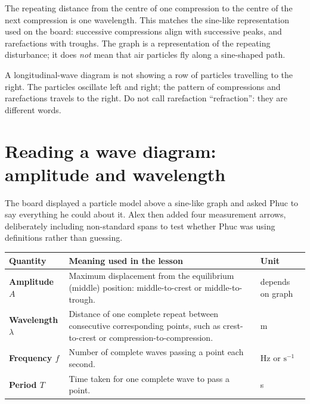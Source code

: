 \documentclass[11pt,a4paper]{article}
\newcommand{\trap}[1]{\begin{mistakebox}#1\end{mistakebox}}
\begin{document}
The repeating distance from the centre of one compression to the centre of the next compression is one wavelength. This matches the sine-like representation used on the board: successive compressions align with successive peaks, and rarefactions with troughs. The graph is a representation of the repeating disturbance; it does \emph{not} mean that air particles fly along a sine-shaped path.

\trap{A longitudinal-wave diagram is not showing a row of particles travelling to the right. The particles oscillate left and right; the pattern of compressions and rarefactions travels to the right. Do not call rarefaction ``refraction'': they are different words.}

\section{Reading a wave diagram: amplitude and wavelength}
The board displayed a particle model above a sine-like graph and asked Phuc to say everything he could about it. Alex then added four measurement arrows, deliberately including non-standard spans to test whether Phuc was using definitions rather than guessing.

\begin{center}
\end{center}

\begin{center}
\begin{tabular}{>{\bfseries}p{2.7cm}p{8.5cm}p{2.1cm}}
\toprule Quantity & Meaning used in the lesson & Unit \\ \midrule
Amplitude $A$ & Maximum displacement from the equilibrium (middle) position: middle-to-crest or middle-to-trough. & depends on graph \\
Wavelength $\lambda$ & Distance of one complete repeat between consecutive corresponding points, such as crest-to-crest or compression-to-compression. & m \\
Frequency $f$ & Number of complete waves passing a point each second. & Hz or $\mathrm{s^{-1}}$ \\
Period $T$ & Time taken for one complete wave to pass a point. & s \\ \bottomrule
\end{tabular}
\end{center}
\end{document}
